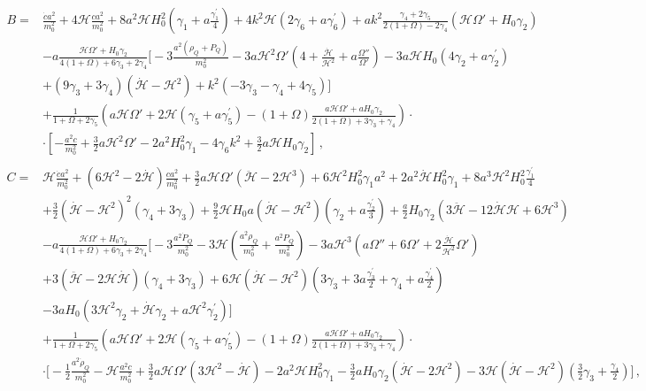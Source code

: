\documentclass[prd,nofootinbib,showpacs]{revtex4}
\def\l{\left}
\def\r{\right}
\def\f{\frac}
\def\hub{{\mathcal H}}
\begin{document}
{\begin{align}
%
B =& \f{\dot{c}a^2}{m_0^2} +4\hub \f{c a^2}{m_0^2} +8 a^2\hub H_0^2\l(\gamma_1 +a\f{\gamma_1^\prime}{4}\r) +4k^2\hub\l(2\gamma_6 +a\gamma_6^\prime \r) + ak^2 \f{\gamma_4+2\gamma_5}{2(1+\Omega) -2\gamma_4}\l(\hub\Omega' +H_0\gamma_2\r) \nonumber\\
& -a\f{\hub \Omega' + H_0\gamma_2}{4(1+\Omega)+6\gamma_3 +2\gamma_4}\bigg[ -3\f{a^2(\rho_{Q}+P_Q)}{m_0^2} -3a\hub^2\Omega'\l( 4+ \f{\dot{\hub}}{\hub^2} +a\f{\Omega''}{\Omega'}\r) -3a\hub H_0 \l(4\gamma_2+a\gamma_2^\prime\r) \nonumber\\
& +\l(9 \gamma_3+3\gamma_4 \r)\l(\dot{\hub} -\hub^2\r) +k^2\l(-3\gamma_3-\gamma_4 +4\gamma_5 \r)\bigg]  \nonumber \\
& +\f{1}{1+\Omega+2\gamma_5}\l( a\hub\Omega' +2\hub\l(\gamma_5+a\gamma_5^\prime\r) -(1+\Omega)\f{a\hub\Omega' +aH_0\gamma_2}{2(1+\Omega) +3\gamma_3+\gamma_4}\r)\cdot \nonumber\\
&\cdot\l[-\f{a^2c}{m_0^2}+\f{3}{2}a\hub^2\Omega'-2a^2H_0^2\gamma_1-4\gamma_6k^2 +\f{3}{2}a\hub H_0\gamma_2 \r] \, , \\
%
& \nonumber \\
%
C =&  \hub\f{\dot{c}a^2}{m_0^2} +\l(6\hub^2-2\dot{\hub}\r)\f{ca^2}{m_0^2}  +\f{3}{2}a\hub\Omega'\l(\ddot{\hub} -2\hub^3\r) +6\hub^2H_0 ^2\gamma_1a^2 + 2a^2\dot{\hub} H_0^2\gamma_1 +8a^3\hub^2 H_0^2\f{\gamma_1^\prime}{4} \nonumber\\
& +\f{3}{2}\l(\dot{\hub} -\hub^2\r)^2\l(\gamma_4 +3\gamma_3\r) +\f{9}{2}\hub H_0 a\l(\dot{\hub}-\hub^2\r)\l(\gamma_2+a\f{\gamma_2^\prime}{3}\r) +\f{a}{2}H_0\gamma_2\l(3\ddot{\hub}-12\dot{\hub}\hub +6\hub^3\r) \nonumber \\
& -a\f{\hub \Omega' + H_0\gamma_2}{4(1+\Omega)+6\gamma_3+2\gamma_4}\bigg[ -3\f{a^2\dot{P}_Q}{m_0^2}-3\hub \l(\f{a^2\rho_Q}{m_0^2} +\f{a^2 P_Q}{m_0^2}\r) -3a\hub^3\l(a\Omega'' +6\Omega' +2\f{\dot{\hub}}{\hub^2}\Omega' \r) \nonumber\\
& +3\l(\ddot{\hub}-2\hub \dot{\hub}\r)\l(\gamma_4 +3\gamma_3\r) +6\hub\l(\dot{\hub}-\hub^2\r)\l(3\gamma_3+3a\f{\gamma_3^\prime}{2} +\gamma_4+a\f{\gamma_4^\prime}{2}\r) \nonumber \\
& -3a H_0\l(3\hub^2\gamma_2+\dot{\hub}\gamma_2 +a\hub^2\gamma_2^\prime\r) \bigg] \nonumber \\
& +\f{1}{1+\Omega+2\gamma_5}\l( a\hub\Omega' +2\hub\l(\gamma_5+a\gamma_5^\prime\r) -(1+\Omega)\f{a\hub\Omega' +aH_0\gamma_2}{2(1+\Omega) +3\gamma_3+\gamma_4}\r)\cdot \nonumber\\
&\cdot\bigg[ -\f{1}{2}\f{a^2\dot{\rho}_Q}{m_0^2} -\hub\f{a^2c}{m_0^2} +\f{3}{2}a\hub\Omega'\l(3\hub^2 -\dot{\hub}\r) -2a^2\hub H_0^2\gamma_1 -\f{3}{2}aH_0\gamma_2\l(\dot{\hub}-2\hub^2\r) -3\hub\l(\dot{\hub}-\hub^2\r)\l(\f{3}{2}\gamma_3 + \f{\gamma_4}{2}\r)\bigg] \, ,\nonumber\\

\end{align}}
\end{document}
